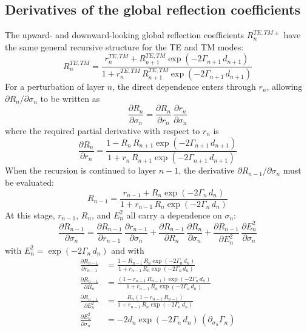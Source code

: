 \documentclass[12pt]{report}
\newcommand{\pds}[1]{\partial_{\sigma_{#1}}}   %
\begin{document}
\subsection{Derivatives of the global reflection coefficients}
\label{sec:global_refl}

The upward- and downward-looking global reflection coefficients
\(R_n^{TE,TM\pm}\) have the same general recursive structure for the TE
and TM modes:
\begin{equation}
    R_n^{TE,TM} =
        \frac{r_n^{TE,TM} + R_{n+1}^{TE,TM}\exp(-2\Gamma_{n+1}\,d_{n+1})}
             {1 + r_n^{TE,TM}\,R_{n+1}^{TE,TM}\exp(-2\Gamma_{n+1}\,d_{n+1})}
    \label{eq:1.22}
\end{equation}
For a perturbation of layer \(n\), the direct dependence enters through
\(r_n\), allowing \(\partial R_n/\partial\sigma_n\) to be written as
\begin{equation}
    \frac{\partial R_n}{\partial \sigma_n} =
        \frac{\partial R_n}{\partial r_n}\,\frac{\partial r_n}{\partial \sigma_n}
    \label{eq:1.23}
\end{equation}
where the required partial derivative with respect to \(r_n\) is
\begin{equation}
    \frac{\partial R_n}{\partial r_n} =
        \frac{1 - R_n\,R_{n+1}\exp(-2\Gamma_{n+1}\,d_{n+1})}
             {1 + r_n\,R_{n+1}\exp(-2\Gamma_{n+1}\,d_{n+1})}
    \label{eq:1.24}
\end{equation}
When the recursion is continued to layer \(n-1\), the derivative
\(\partial R_{n-1}/\partial\sigma_n\) must be evaluated:
\begin{equation}
    R_{n-1} =
        \frac{r_{n-1} + R_n\exp(-2\Gamma_n\,d_n)}
             {1 + r_{n-1}\,R_n\exp(-2\Gamma_n\,d_n)}
    \label{eq:1.25}
\end{equation}
At this stage, \(r_{n-1}\), \(R_n\), and \(E_n^2\) all carry a
dependence on \(\sigma_n\):
\begin{equation}
    \frac{\partial R_{n-1}}{\partial \sigma_n} =
        \frac{\partial R_{n-1}}{\partial r_{n-1}}\,\frac{\partial r_{n-1}}{\partial \sigma_n}
      + \frac{\partial R_{n-1}}{\partial R_n}\,\frac{\partial R_n}{\partial \sigma_n}
      + \frac{\partial R_{n-1}}{\partial E_n^2}\,\frac{\partial E_n^2}{\partial \sigma_n}
    \label{eq:1.26}
\end{equation}
with \(E_n^2 = \exp(-2\Gamma_n\,d_n)\) and with
\begin{align}
    \frac{\partial R_{n-1}}{\partial r_{n-1}}
    &= \frac{1 - R_{n-1}\,R_n\exp(-2\Gamma_n\,d_n)}
            {1 + r_{n-1}\,R_n\exp(-2\Gamma_n\,d_n)}
    \label{eq:1.27} \\
    \frac{\partial R_{n-1}}{\partial R_n}
    &= \frac{(1 - r_{n-1}\,R_{n-1})\exp(-2\Gamma_n\,d_n)}
            {1 + r_{n-1}\,R_n\exp(-2\Gamma_n\,d_n)}
    \label{eq:1.28} \\
    \frac{\partial R_{n-1}}{\partial E_n^2}
    &= \frac{R_n(1 - r_{n-1}\,R_{n-1})}
            {1 + r_{n-1}\,R_n\exp(-2\Gamma_n\,d_n)}
    \label{eq:1.29} \\
    \frac{\partial E_n^2}{\partial \sigma_n}
    &= -2d_n\exp(-2\Gamma_n\,d_n)\,(\pds{n}\Gamma_n)
    \label{eq:1.30}
\end{align}
\end{document}
